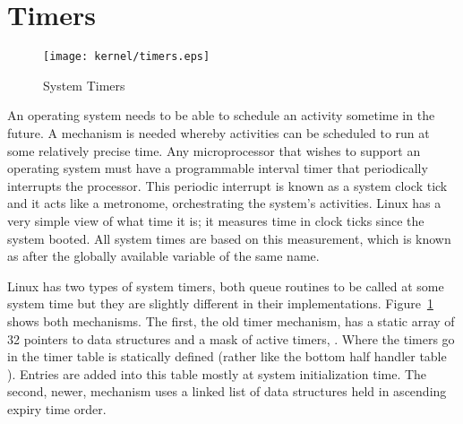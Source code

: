 \section{Timers}
\label{kernel-timers-section}
\begin{figure}
\begin{center}
{\centering \texttt{[image: kernel/timers.eps]} \par}
\end{center}
\caption{System Timers}
\label{timer-figure}
\end{figure}
An operating system needs to be able to schedule an activity sometime in the
future.
A mechanism is needed whereby activities can be scheduled to run at some 
relatively precise time.
Any microprocessor that wishes to support an operating system must have a programmable
interval timer that periodically interrupts the processor.
This periodic interrupt is known as a system clock tick and it acts like a 
metronome, orchestrating the system's activities.
Linux has a very simple view of what time it is; it measures time in clock ticks
since the system booted.  All system times are based on this measurement, which is
known as  after the globally available variable of the same name.

Linux has two types of system timers, both queue routines to be called at some
system time but they are slightly different in their implementations.
Figure~\ref{timer-figure} shows both mechanisms.
The first,  the old timer mechanism, has a static array of 32 pointers to 
 data structures and a mask of active timers, .
Where the timers go in the timer table is statically defined (rather like the bottom
half handler table ).
Entries are added into this table mostly at system initialization time.
The second, newer, mechanism uses a linked list of  data structures
 held in ascending expiry time order.

